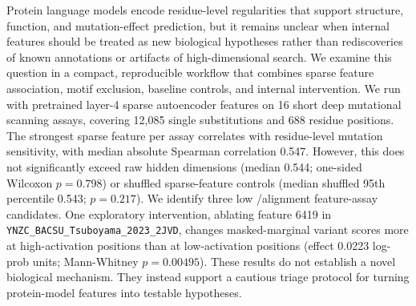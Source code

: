 Protein language models encode residue-level regularities that support structure, function, and mutation-effect prediction, but it remains unclear when internal features should be treated as new biological hypotheses rather than rediscoveries of known annotations or artifacts of high-dimensional search. We examine this question in a compact, reproducible workflow that combines sparse feature association, motif exclusion, baseline controls, and internal intervention. We run \esmeight with pretrained layer-4 \interplm sparse autoencoder features on 16 short \proteingym deep mutational scanning assays, covering 12,085 single substitutions and 688 residue positions. The strongest sparse feature per assay correlates with residue-level mutation sensitivity, with median absolute Spearman correlation 0.547. However, this does not significantly exceed raw \esm hidden dimensions (median 0.544; one-sided Wilcoxon $p=0.798$) or shuffled sparse-feature controls (median shuffled 95th percentile 0.543; $p=0.217$). We identify three low \elm/\prosite alignment feature-assay candidates. One exploratory intervention, ablating \interplm feature 6419 in \texttt{YNZC\_BACSU\_Tsuboyama\_2023\_2JVD}, changes \esm masked-marginal variant scores more at high-activation positions than at low-activation positions (effect 0.0223 log-prob units; Mann-Whitney $p=0.00495$). These results do not establish a novel biological mechanism. They instead support a cautious triage protocol for turning protein-model features into testable hypotheses.

